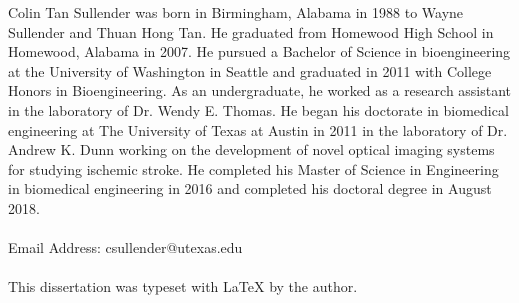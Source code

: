 \documentclass[12pt]{report}
\begin{document}




\begin{vita}
\noindent Colin Tan Sullender was born in Birmingham, Alabama in 1988 to Wayne Sullender and Thuan Hong Tan. He graduated from Homewood High School in Homewood, Alabama in 2007. He pursued a Bachelor of Science in bioengineering at the University of Washington in Seattle and graduated in 2011 with College Honors in Bioengineering. As an undergraduate, he worked as a research assistant in the laboratory of Dr. Wendy E. Thomas. He began his doctorate in biomedical engineering at The University of Texas at Austin in 2011 in the laboratory of Dr. Andrew K. Dunn working on the development of novel optical imaging systems for studying ischemic stroke. He completed his Master of Science in Engineering in biomedical engineering in 2016 and completed his doctoral degree in August 2018.
\\
\\
Email Address: csullender@utexas.edu
\\
\\
This dissertation was typeset with \LaTeX{} by the author.
\end{vita}


\end{document}
